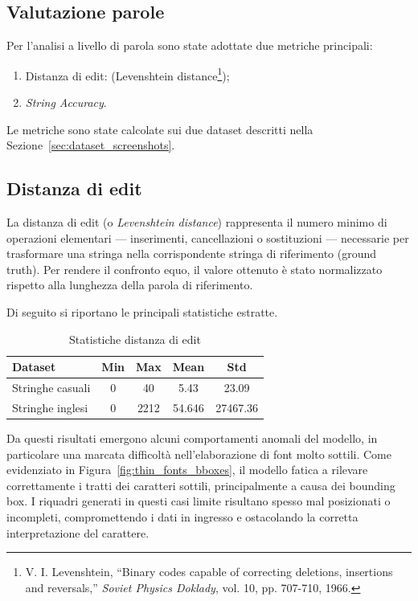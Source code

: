 \subsection{Valutazione parole}
\label{sec:valutazione-stringhe}

Per l'analisi a livello di parola sono state adottate due metriche principali:
\begin{enumerate}
    \item Distanza di edit: (Levenshtein distance\footnote{V. I. Levenshtein, “Binary codes capable of correcting deletions, insertions and reversals,” \textit{Soviet Physics Doklady}, vol. 10, pp. 707-710, 1966.});
    \item \emph{String Accuracy}.
\end{enumerate}

Le metriche sono state calcolate sui due dataset descritti nella Sezione~\ref{sec:dataset_screenshots}.

\subsection*{Distanza di edit}

La distanza di edit (o \emph{Levenshtein distance}) rappresenta il numero minimo di operazioni elementari — inserimenti, cancellazioni o sostituzioni — necessarie per trasformare una stringa nella corrispondente stringa di riferimento (ground truth).  
Per rendere il confronto equo, il valore ottenuto è stato normalizzato rispetto alla lunghezza della parola di riferimento.

Di seguito si riportano le principali statistiche estratte.

\begin{table}[htbp]
    \centering
    \begin{tabular}{lcccc}
        \toprule
        Dataset                 & Min   & Max   & Mean  & Std   \\
        \midrule
        Stringhe casuali       & 0  & 40 & 5.43  & 23.09 \\
        Stringhe inglesi & 0  & 2212 & 54.646  & 27467.36 \\
        \bottomrule
    \end{tabular}
    \caption{Statistiche distanza di edit}
    \label{tab:edit_distance_stats}
\end{table}

Da questi risultati emergono alcuni comportamenti anomali del modello, in particolare una marcata difficoltà nell'elaborazione di font molto sottili. Come evidenziato in Figura~\ref{fig:thin_fonts_bboxes}, il modello fatica a rilevare correttamente i tratti dei caratteri sottili, principalmente a causa dei bounding box. I riquadri generati in questi casi limite risultano spesso mal posizionati o incompleti, compromettendo i dati in ingresso e ostacolando la corretta interpretazione del carattere.

